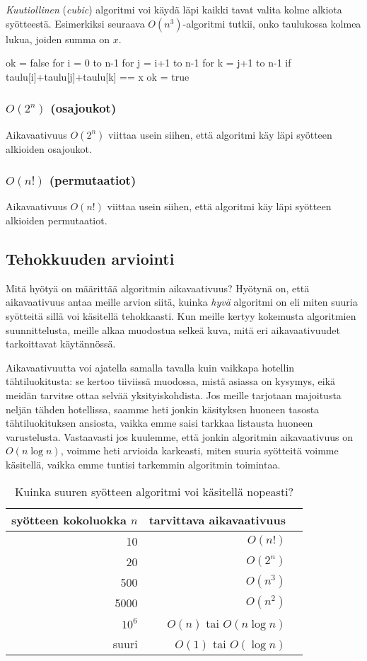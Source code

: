\emph{Kuutiollinen} (\emph{cubic}) algoritmi voi käydä läpi kaikki tavat valita
kolme alkiota syöt\-teestä.
Esimerkiksi seuraava $O(n^3)$-algoritmi tutkii, onko taulukossa
kolmea lukua, joiden summa on $x$.

\begin{code}
ok = false
for i = 0 to n-1
    for j = i+1 to n-1
        for k = j+1 to n-1
            if taulu[i]+taulu[j]+taulu[k] == x
                ok = true
\end{code}

\subsubsection{$O(2^n)$ (osajoukot)}

Aikavaativuus $O(2^n)$ viittaa usein siihen,
että algoritmi käy läpi syötteen alkioiden osajoukot.

\subsubsection{$O(n!)$ (permutaatiot)}

Aikavaativuus $O(n!)$ viittaa usein siihen,
että algoritmi käy läpi syötteen alkioiden permutaatiot.

\subsection{Tehokkuuden arviointi}

Mitä hyötyä on määrittää algoritmin aikavaativuus?
Hyötynä on, että aikavaativuus antaa meille arvion siitä,
kuinka \emph{hyvä} algoritmi on eli miten suuria syötteitä
sillä voi käsitellä tehokkaasti.
Kun meille kertyy kokemusta algoritmien suunnittelusta,
meille alkaa muodostua selkeä kuva,
mitä eri aikavaativuudet tarkoittavat käytännössä.

Aikavaativuutta voi ajatella samalla tavalla kuin vaikkapa
hotellin tähti\-luokitusta: se kertoo tiiviissä muodossa,
mistä asiassa on kysymys, eikä mei\-dän tarvitse ottaa selvää yksityiskohdista.
Jos meille tarjotaan majoitusta neljän tähden hotellissa,
saamme heti jonkin käsityksen huoneen tasosta
tähtiluokituksen ansiosta,
vaikka emme saisi tarkkaa listausta huoneen varustelusta.
Vastaavasti jos kuulemme, että jonkin algoritmin aikavaativuus on $O(n \log n)$,
voimme heti arvioida karkeasti, miten suuria syötteitä voimme käsitellä,
vaikka emme tuntisi tarkemmin algoritmin toimintaa.

\begin{table}
\center
\begin{tabular}{rrr}
syötteen kokoluokka $n$ & tarvittava aikavaativuus \\
\hline
10 & $O(n!)$ \\
20 & $O(2^n)$ \\
500 & $O(n^3)$ \\
5000 & $O(n^2)$ \\
$10^6$ & $O(n)$ tai $O(n \log n)$ \\
suuri & $O(1)$ tai $O(\log n)$ \\
\end{tabular}
\caption{Kuinka suuren syötteen algoritmi voi käsitellä nopeasti?}
\label{tab:algteh}
\end{table}

